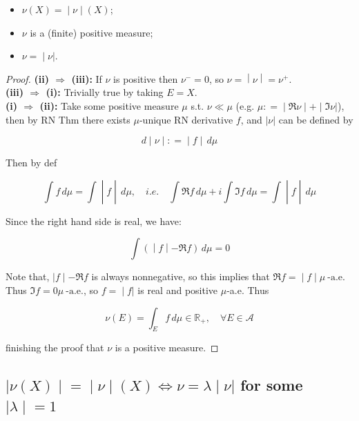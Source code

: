 \begin{itemize}
\item
  \(\left. \nu(X) = \middle| \nu \middle| (X) \right.\);
\item
  \(\nu\) is a (finite) positive measure;
\item
  \(\left. \nu = \middle| \nu| \right.\).
\end{itemize}

\begin{proof}

\textbf{(ii) \(\Longrightarrow\) (iii):} If \(\nu\) is positive then \(\nu^{-} = 0\), so \(\left. \nu = \middle| \nu \middle| = \nu^{+} \right.\).\\
\textbf{(iii) \(\Longrightarrow\) (i):} Trivially true by taking \(E = X\).\\
\textbf{(i) \(\Longrightarrow\) (ii):} Take some positive measure \(\mu\) s.t. \(\nu \ll \mu\) (e.g. \(\left. \mu: = \middle| \Re\nu \middle| + \middle| \Im\nu| \right.\)), then by RN Thm there exists \(\mu\)-unique RN derivative \(f\), and \(|\nu|\) can be defined by

\[\left. d \middle| \nu \middle| : = \middle| f \middle| \, d\mu \right.\]

Then by def

\[\left. \int f\, d\mu = \int \middle| f \middle| \, d\mu,\quad i.e.\quad\int\Re f\, d\mu + i\int\Im f\, d\mu = \int \middle| f \middle| \, d\mu \right.\]

Since the right hand side is real, we have:

\[\left. \int( \middle| f \middle| - \Re f)\, d\mu = 0 \right.\]

Note that, \(\left. |f \middle| - \Re f \right.\) is always nonnegative, so this implies that \(\left. \Re f = \middle| f \middle| \mu\ \text{-a.e.} \right.\)\\
Thus \(\Im f = 0\mu\ \text{-a.e.}\), so \(\left. f = \middle| f| \right.\) is real and positive \(\mu\)-a.e. Thus

\[\nu(E) = \int_{E}f\, d\mu \in \mathbb{R}_{+},\quad\forall E \in \mathcal{A}\]

finishing the proof that \(\nu\) is a positive measure.

\end{proof}

\subsection{\texorpdfstring{\(\left. |\nu(X) \middle| = \middle| \nu \middle| (X)\Leftrightarrow\nu = \lambda \middle| \nu| \right.\) for some \(\left. |\lambda \middle| = 1 \right.\)}{\textbackslash left. \textbar\textbackslash nu(X) \textbackslash middle\textbar{} = \textbackslash middle\textbar{} \textbackslash nu \textbackslash middle\textbar{} (X)\textbackslash Leftrightarrow\textbackslash nu = \textbackslash lambda \textbackslash middle\textbar{} \textbackslash nu\textbar{} \textbackslash right. for some \textbackslash left. \textbar\textbackslash lambda \textbackslash middle\textbar{} = 1 \textbackslash right.}}

